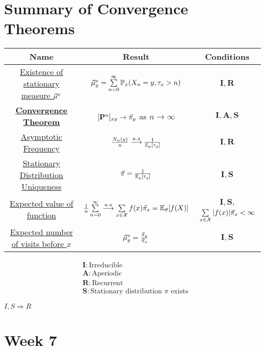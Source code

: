 \documentclass[12pt,a4paper]{article}
\begin{document}
\section{Summary of Convergence Theorems}
\begin{tabular}{|c|c|c|}
\hline 
Name & Result & Conditions \\
\hline 
\hyperref[thm411]{Existence of stationary measure $\va\mu^x$} & 
$\va\mu^x_y = \sum\limits_{n=0}^{\infty}\mathbb{P}_x(X_n = y, \tau_x > n)$
 & $\mathbf{I}, \mathbf{R}$ \\ 
\hline 
\hyperref[convthm]{\textbf{Convergence Theorem}} & $[\vb P^n]_{xy} \to \va\pi_y$ as $n\to \infty$ & $\mathbf{I}, \mathbf{A}, \mathbf{S}$ \\
\hline 
\hyperref[asymfreq]{Asymptotic Frequency} & $\frac{N_n(y)}{n}\overset{a.s}{\longrightarrow} \frac{1}{\mathbb{E}_y[\tau_y]}$ & $\mathbf{I, R}$ \\ 
\hline 
\hyperref[uniquedist]{Stationary Distribution Uniqueness} & $\va\pi = \frac{1}{\mathbb{E}_y[\tau_y]}$ & $\mathbf{I,S}$ \\ 
\hline 
\hyperref[expfun]{Expected value of function} & 
$\frac{1}{n}\sum\limits_{n=0}^{\infty}\overset{a.s}{\longrightarrow} \sum\limits_{x\in \mathcal{X}}^{}f(x)\va\pi_x = \mathbb{E}_{\va\pi}[f(X)]$
 & $\mathbf{I, S}$, $\sum\limits_{x\in \mathcal{X}}^{}|f(x)|\va\pi_x < \infty$\\ 
\hline 
\hyperref[thm611]{Expected number of visits before $x$} & $\va\mu^x_y = \frac{\va\pi_y}{\va\pi_x}$ & $\mathbf{I, S}$ \\ 
\hline 
\end{tabular} 
\begin{note}
\begin{align*}
&\mathbf{I}: \text{Irreducible}\\
&\mathbf{A}: \text{Aperiodic}\\
&\mathbf{R}: \text{Recurrent}\\
&\mathbf{S}: \text{Stationary distribution $\pi$ exists}
\end{align*}
\end{note}
\begin{remark}
$I, S \Rightarrow R$
\end{remark}
\newpage
\section{Week 7}
\end{document}
